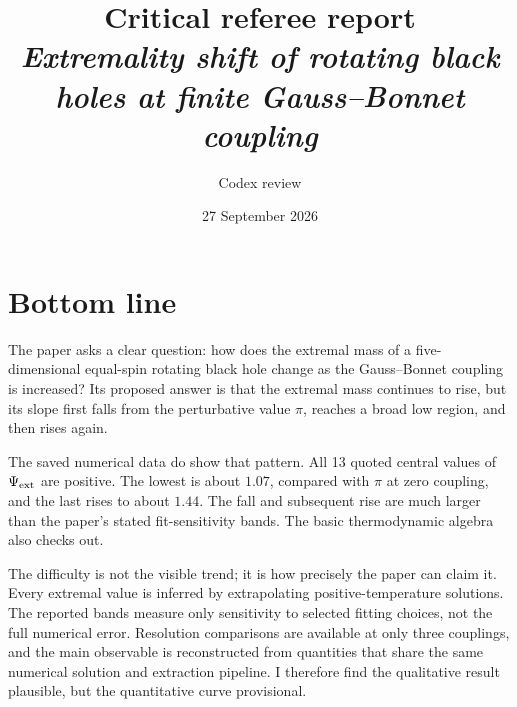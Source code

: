 \documentclass[11pt,a4paper]{article}
\title{Critical referee report\\[0.35em]
\large \emph{Extremality shift of rotating black holes at finite Gauss--Bonnet coupling}}
\author{Codex review}
\date{27 September 2026}
\begin{document}
\maketitle

\begin{center}
\end{center}

\section*{Bottom line}

The paper asks a clear question: how does the extremal mass of a five-dimensional equal-spin rotating black hole change as the Gauss--Bonnet coupling is increased?  Its proposed answer is that the extremal mass continues to rise, but its slope first falls from the perturbative value $\pi$, reaches a broad low region, and then rises again.

The saved numerical data do show that pattern.  All 13 quoted central values of $\Psi_{\rm ext}$ are positive.  The lowest is about $1.07$, compared with $\pi$ at zero coupling, and the last rises to about $1.44$.  The fall and subsequent rise are much larger than the paper's stated fit-sensitivity bands.  The basic thermodynamic algebra also checks out.

The difficulty is not the visible trend; it is how precisely the paper can claim it.  Every extremal value is inferred by extrapolating positive-temperature solutions.  The reported bands measure only sensitivity to selected fitting choices, not the full numerical error.  Resolution comparisons are available at only three couplings, and the main observable is reconstructed from quantities that share the same numerical solution and extraction pipeline.  I therefore find the qualitative result plausible, but the quantitative curve provisional.
\end{document}
